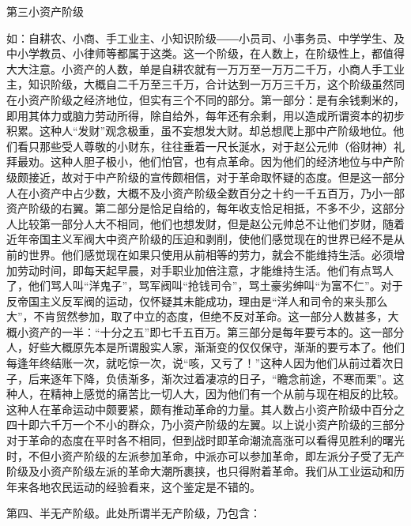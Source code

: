 第三小资产阶级

如：自耕农、小商、手工业主、小知识阶级――小员司、小事务员、中学学生、及中小学教员、小律师等都属于这类。这一个阶级，在人数上，在阶级性上，都值得大大注意。小资产的人数，单是自耕农就有一万万至一万万二千万，小商人手工业主，知识阶级，大概自二千万至三千万，合计达到一万万三千万，这个阶级虽然同在小资产阶级之经济地位，但实有三个不同的部分。第一部分：是有余钱剩米的，即用其体力或脑力劳动所得，除自给外，每年还有余剩，用以造成所谓资本的初步积累。这种人“发财”观念极重，虽不妄想发大财。却总想爬上那中产阶级地位。他们看只那些受人尊敬的小财东，往往垂着一尺长涎水，对于赵公元帅（俗财神）礼拜最劝。这种人胆子极小，他们怕官，也有点革命。因为他们的经济地位与中产阶级颇接近，故对于中产阶级的宣传颇相信，对于革命取怀疑的态度。但是这一部分人在小资产中占少数，大概不及小资产阶级全数百分之十约一千五百万，乃小一部资产阶级的右翼。第二部分是恰足自给的，每年收支恰足相抵，不多不少，这部分人比较第一部分人大不相同，他们也想发财，但是赵公元帅总不让他们岁财，随着近年帝国主义军阀大中资产阶级的压迫和剥削，使他们感觉现在的世界已经不是从前的世界。他们感觉现在如果只使用从前相等的劳力，就会不能维持生活。必须增加劳动时间，即每天起早晨，对手职业加倍注意，才能维持生活。他们有点骂人了，他们骂人叫“洋鬼子”，骂军阀叫“抢钱司令”，骂土豪劣绅叫“为富不仁”。对于反帝国主义反军阀的运动，仅怀疑其未能成功，理由是“洋人和司令的来头那么大”，不肯贸然参加，取了中立的态度，但绝不反对革命。这一部分人数甚多，大概小资产的一半：“十分之五”即七千五百万。第三部分是每年要亏本的。这一部分人，好些大概原先本是所谓殷实人家，渐渐变的仅仅保守，渐渐的要亏本了。他们每逢年终结账一次，就吃惊一次，说“咳，又亏了！”这种人因为他们从前过着次日子，后来逐年下降，负债渐多，渐次过着凄凉的日子，“瞻念前途，不寒而栗”。这种人，在精神上感觉的痛苦比一切人大，因为他们有一个从前与现在相反的比较。这种人在革命运动中颇要紧，颇有推动革命的力量。其人数占小资产阶级中百分之四十即六千万一个不小的群众，乃小资产阶级的左翼。以上说小资产阶级的三部分对于革命的态度在平时各不相同，但到战时即革命潮流高涨可以看得见胜利的曙光时，不但小资产阶级的左派参加革命，中派亦可以参加革命，即左派分子受了无产阶级及小资产阶级左派的革命大潮所裹挟，也只得附着革命。我们从工业运动和历年来各地农民运动的经验看来，这个鉴定是不错的。

第四、半无产阶级。此处所谓半无产阶级，乃包含：

